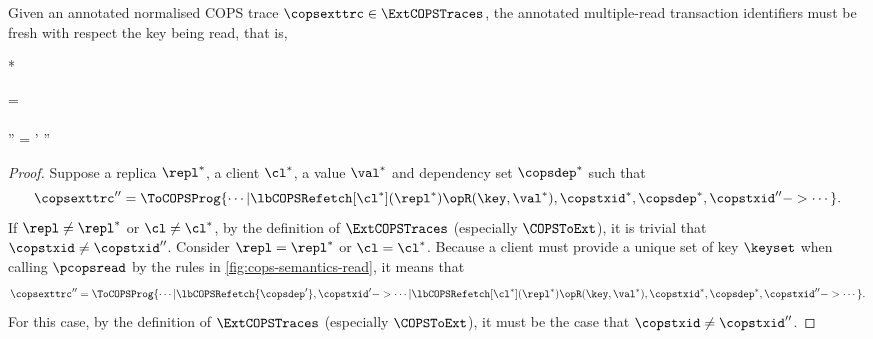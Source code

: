 \label{sec:proof-multiple-read-trans-id-unique}
\begin{proposition}
\label{prop:cops-read-id-unique}
Given an annotated normalised COPS trace \( \copsexttrc \in \ExtCOPSTraces \),
the annotated multiple-read transaction identifiers must be fresh with respect the key being read,
that is,
\begin{Formulae}*
\begin{Formula}
\copsexttrc = 
        \\ \land
        \Forall{\repl^* \in \COPSReplicas | \cl^* \in \Clients | \val^* \in \Values | \copsdep^* \in \COPSDependencies }
        \\ \copsexttrc'' = 
        \implies  \copstxid' \neq \copstxid''
\end{Formula}
\end{Formulae}
\end{proposition}
\begin{proof}
Suppose a replica \( \repl^* \), a client \( \cl^* \), a value \( \val^* \) and dependency set \( \copsdep^* \)
such that
\[
\copsexttrc'' = \ToCOPSProg{\cdots | \lbCOPSRefetch[\cl^*](\repl^*){\opR(\key,\val^*), \copstxid^*, \copsdep^* }, \copstxid'' -> \cdots }.
\]
If \( \repl \neq \repl^*\) or \( \cl \neq \cl^* \), 
by the definition of \(\ExtCOPSTraces\) (especially \(\COPSToExt\)), it is trivial that \(\copstxid \neq \copstxid''\).
Consider \( \repl = \repl^*\) or \( \cl = \cl^* \).
Because a client must provide a unique set of key \( \keyset \) when calling \( \pcopsread \)
by the rules in \cref{fig:cops-semantics-read},
it means that
\[
\copsexttrc'' = \ToCOPSProg{\cdots | \lbCOPSRefetch{ \copsdep' }, \copstxid'
    -> \cdots | \lbCOPSRefetch[\cl^*](\repl^*){\opR(\key,\val^*), \copstxid^*, \copsdep^* }, \copstxid'' -> \cdots }.
\]
For this case, by the definition of \(\ExtCOPSTraces\) (especially \(\COPSToExt\)), 
it must be the case that \(\copstxid \neq \copstxid''\).
\end{proof}


